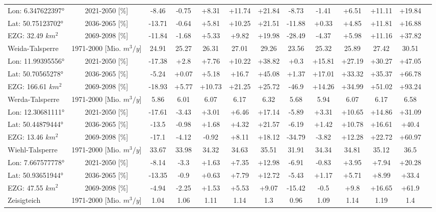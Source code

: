 \begin{longtable}{@{\extracolsep{\fill}}lc|ccccc||cccccc}
\cline{2-13} 
Lon: 6.347622397° & 2021-2050 [\%]  & -8.46 & -0.75 & +8.31 & +11.74 & +21.84 & -8.73 & -1.41 & +6.51 & +11.11 & +19.84 & \\ 
Lat: 50.75123702° & 2036-2065 [\%]  & -13.71 & -0.64 & +5.81 & +10.25 & +21.51 & -11.88 & +0.33 & +4.85 & +11.81 & +16.88 & \\ 
EZG: 32.49 $km^2$ & 2069-2098 [\%]  & -11.84 & -1.68 & +5.33 & +9.82 & +19.98 & -28.49 & -4.37 & +5.98 & +11.16 & +37.82 & \\ 
\hline 
Weida-Talsperre & 1971-2000 [Mio. $m^3/y$]  & 24.91 & 25.27 & 26.31 & 27.01 & 29.26 & 23.56 & 25.32 & 25.89 & 27.42 & 30.51 & \\ 
\cline{2-13} 
Lon: 11.99395556° & 2021-2050 [\%]  & -17.38 & +2.8 & +7.76 & +10.22 & +38.82 & +0.3 & +15.81 & +27.19 & +30.27 & +47.05 & \\ 
Lat: 50.70565278° & 2036-2065 [\%]  & -5.24 & +0.07 & +5.18 & +16.7 & +45.08 & +1.37 & +17.01 & +33.32 & +35.37 & +66.78 & \\ 
EZG: 166.61 $km^2$ & 2069-2098 [\%]  & -18.93 & +5.77 & +10.73 & +21.25 & +25.72 & -46.9 & +14.26 & +34.99 & +51.02 & +93.24 & \\ 
\hline 
Werda-Talsperre & 1971-2000 [Mio. $m^3/y$]  & 5.86 & 6.01 & 6.07 & 6.17 & 6.32 & 5.68 & 5.94 & 6.07 & 6.17 & 6.58 & \\ 
\cline{2-13} 
Lon: 12.30681111° & 2021-2050 [\%]  & -17.61 & -3.43 & +3.01 & +6.46 & +17.14 & -5.89 & +3.31 & +10.65 & +14.86 & +31.09 & \\ 
Lat: 50.44879444° & 2036-2065 [\%]  & -13.5 & -0.98 & +1.68 & +4.32 & +21.57 & -6.19 & +1.42 & +10.78 & +16.61 & +40.4 & \\ 
EZG: 13.46 $km^2$ & 2069-2098 [\%]  & -17.1 & -4.12 & -0.92 & +8.11 & +18.12 & -34.79 & -3.82 & +12.28 & +22.72 & +60.97 & \\ 
\hline 
Wiehl-Talsperre & 1971-2000 [Mio. $m^3/y$]  & 33.67 & 33.98 & 34.32 & 34.63 & 35.51 & 31.91 & 34.34 & 34.81 & 35.12 & 36.5 & \\ 
\cline{2-13} 
Lon: 7.667577778° & 2021-2050 [\%]  & -8.14 & -3.3 & +1.63 & +7.35 & +12.98 & -6.91 & -0.83 & +3.95 & +7.94 & +20.28 & \\ 
Lat: 50.93651944° & 2036-2065 [\%]  & -13.35 & -0.9 & +0.63 & +7.79 & +12.72 & -5.43 & +1.17 & +5.71 & +8.99 & +33.4 & \\ 
EZG: 47.55 $km^2$ & 2069-2098 [\%]  & -4.94 & -2.25 & +1.53 & +5.53 & +9.07 & -15.42 & -0.5 & +9.8 & +16.65 & +61.9 & \\ 
\hline 
Zeisigteich & 1971-2000 [Mio. $m^3/y$]  & 1.04 & 1.06 & 1.11 & 1.14 & 1.3 & 0.96 & 1.09 & 1.14 & 1.19 & 1.4 & \\ 

\end{longtable}

